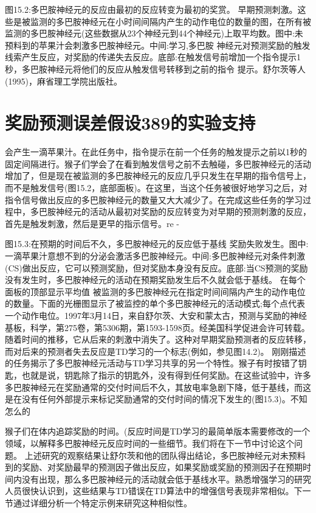 图15.2:多巴胺神经元的反应由最初的反应转变为最初的奖赏。
早期预测刺激。这些是被监测的多巴胺神经元在小时间间隔内产生的动作电位的数量的图，在所有被监测的多巴胺神经元(这些数据从23个神经元到44个神经元)上取平均数。图中:未预料到的苹果汁会刺激多巴胺神经元。中间:学习,多巴胺
神经元对预测奖励的触发线索产生反应，对奖励的传递失去反应。底部:在触发信号前增加一个指令提示1秒，多巴胺神经元将他们的反应从触发信号转移到之前的指令
提示。舒尔茨等人(1995)，麻省理工学院出版社。

\section{奖励预测误差假设389的实验支持}

会产生一滴苹果汁。在此任务中，指令提示在前一个任务的触发提示之前以1秒的固定间隔进行。猴子们学会了在看到触发信号之前不去触碰，多巴胺神经元的活动增加了，但是现在被监测的多巴胺神经元的反应几乎只发生在早期的指令信号上，而不是触发信号(图15.2，底部面板)。在这里，当这个任务被很好地学习之后，对指令信号做出反应的多巴胺神经元的数量又大大减少了。在完成这些任务的学习过程中，多巴胺神经元的活动从最初对奖励的反应转变为对早期的预测刺激的反应，首先是触发刺激，然后是更早的指示信号。re -

图15.3:在预期的时间后不久，多巴胺神经元的反应低于基线
奖励失败发生。图中:一滴苹果汁意想不到的分泌会激活多巴胺神经元。中间:多巴胺神经元对条件刺激(CS)做出反应，它可以预测奖励，但对奖励本身没有反应。底部:当CS预测的奖励没有发生时，多巴胺神经元的活动在预期奖励发生后不久就会低于基线。
在每个面板的顶部显示平均值
被监测的多巴胺神经元在指定时间间隔内产生的动作电位的数量。下面的光栅图显示了被监控的单个多巴胺神经元的活动模式;每个点代表一个动作电位。1997年3月14日，来自舒尔茨、大安和蒙太古，预测与奖励的神经基板，科学，第275卷，第5306期，第1593-1598页。经美国科学促进会许可转载。
随着时间的推移，它从后来的刺激中消失了。这种对早期奖励预测者的反应转移，而对后来的预测者失去反应是TD学习的一个标志(例如，参见图14.2)。
刚刚描述的任务揭示了多巴胺神经元活动与TD学习共享的另一个特性。猴子有时按错了钥匙，也就是说，钥匙除了指示的钥匙外，没有得到任何奖励。在这些试验中，许多多巴胺神经元在奖励通常的交付时间后不久，其放电率急剧下降，低于基线，而这是在没有任何外部提示来标记奖励通常的交付时间的情况下发生的(图15.3)。不知怎么的

猴子们在体内追踪奖励的时间。(反应时间是TD学习的最简单版本需要修改的一个领域，以解释多巴胺神经元反应时间的一些细节。我们将在下一节中讨论这个问题。
上述研究的观察结果让舒尔茨和他的团队得出结论，多巴胺神经元对未预料到的奖励、对奖励最早的预测因子做出反应，如果奖励或奖励的预测因子在预期时间内没有出现，那么多巴胺神经元的活动就会低于基线水平。熟悉增强学习的研究人员很快认识到，这些结果与TD错误在TD算法中的增强信号表现非常相似。下一节通过详细分析一个特定示例来研究这种相似性。


